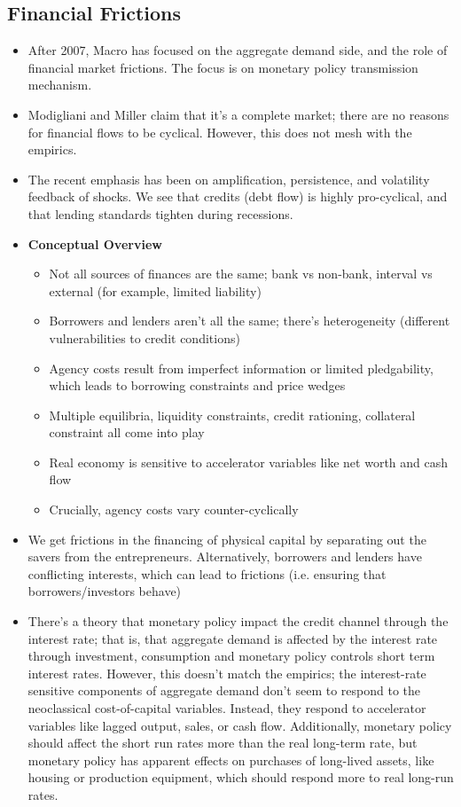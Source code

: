 \documentclass[12pt]{article}
\begin{document}
\subsection{Financial Frictions}

\begin{itemize}
    \item After 2007, Macro has focused on the aggregate demand side, and the role of financial market frictions. The focus is on monetary policy transmission mechanism. 
    \item Modigliani and Miller claim that it's a complete market; there are no reasons for financial flows to be cyclical. However, this does not mesh with the empirics. 
    \item The recent emphasis has been on amplification, persistence, and volatility feedback of shocks. We see that credits (debt flow) is highly pro-cyclical, and that lending standards tighten during recessions.
    \item \textbf{Conceptual Overview}
    \begin{itemize}
        \item Not all sources of finances are the same; bank vs non-bank, interval vs external (for example, limited liability)
        \item Borrowers and lenders aren't all the same; there's heterogeneity (different vulnerabilities to credit conditions)
        \item Agency costs result from imperfect information or limited pledgability, which leads to borrowing constraints and price wedges
        \item Multiple equilibria, liquidity constraints, credit rationing, collateral constraint all come into play
        \item Real economy is sensitive to accelerator variables like net worth and cash flow
        \item Crucially, agency costs vary counter-cyclically
    \end{itemize}
    \item We get frictions in the financing of physical capital by separating out the savers from the entrepreneurs. Alternatively, borrowers and lenders have conflicting interests, which can lead to frictions (i.e. ensuring that borrowers/investors behave)
    \item There's a theory that monetary policy impact the credit channel through the interest rate; that is, that aggregate demand is affected by the interest rate through investment, consumption and monetary policy controls short term interest rates. However, this doesn't match the empirics; the interest-rate sensitive components of aggregate demand don't seem to respond to the neoclassical cost-of-capital variables. Instead, they respond to accelerator variables like lagged output, sales, or cash flow. Additionally, monetary policy should affect the short run rates more than the real long-term rate, but monetary policy has apparent effects on purchases of long-lived assets, like housing or production equipment, which should respond more to real long-run rates.

\end{itemize}
\end{document}
